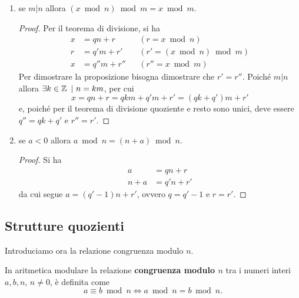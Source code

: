 \begin{proposizione}
\begin{enumerate}
\begin{proof}
Sottraendo $b$ da $a$ si ottiene
\[
a-b=qn+r-(q'n+r')=(q-q')+r-r'=\bar{q}n
\]
dove $\bar{q}\in\Z$ e $r-r'=0$ per ipotesi.
\end{proof}
\item se $m|n$ allora $(x\bmod n)\bmod m = x\bmod m$.
\begin{proof}
Per il teorema di divisione, si ha
\begin{align*}
x&=qn+r &&(r=x\bmod n)\\
r&=q'm+r' &&(r'=(x\bmod n)\bmod m)\\
x&=q''m + r'' &&(r''=x\bmod m)
\end{align*}
Per dimostrare la proposizione bisogna dimostrare che $r'=r''$. Poiché $m|n$ allora $\exists k\in\operatorname*{\mathbb{Z}}\ |\ n=km$, per cui
\[
x=qn+r=qkm+q'm+r'=(qk+q')m+r'
\]
e, poiché per il teorema di divisione quoziente e resto sono unici, deve essere $q''=qk+q'$ e $r''=r'$.
\end{proof}
\item se $a < 0$ allora $a\bmod n = (n+a)\bmod n$.
\begin{proof} Si ha
 \begin{align*}
  a &= qn+r \\
  n+a &= q'n+r'
 \end{align*}
 da cui segue $a=(q'-1)n+r'$, ovvero $q=q'-1$ e $r=r'$.
\end{proof}
\end{enumerate}
\end{proposizione}

\subsection{Strutture quozienti}
Introduciamo ora la relazione congruenza modulo $n$.
\begin{definizione}
In aritmetica modulare la relazione \textbf{congruenza modulo $n$} tra i numeri interi $a,b,n$, $n\neq 0$, è definita come
\[
a \equiv b\bmod n \Leftrightarrow a\bmod n = b\bmod n.
\]
\end{definizione}

